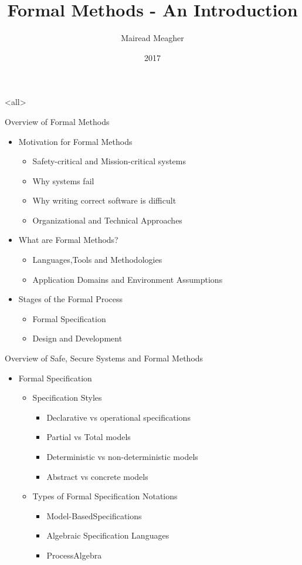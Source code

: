 \documentclass{beamerswitch}
\author[MM]{Mairead Meagher}
\title{Formal Methods - An Introduction}
\institute{Waterford Institute of Technology, }
\date{2017}
\begin{document}
 \mode<all>
\frame{\titlepage}
\begin{frame}{Overview of Formal Methods}
\begin{itemize}
  \item Motivation for Formal Methods
  	\begin{itemize}
		\item Safety-critical and Mission-critical systems
		\item Why systems fail
		\item Why writing correct software is difficult 
		\item Organizational and Technical Approaches
	\end{itemize}
  \item What are Formal Methods? 
	\begin{itemize}
	\item Languages,Tools and Methodologies
	\item Application Domains and Environment Assumptions
	\end{itemize}
  \item Stages of the Formal Process
  \begin{itemize}
  	\item Formal Specification
	\item Design and Development
   \end{itemize}
  \end{itemize}
  \end{frame}
  \begin{frame} {Overview of Safe, Secure Systems and Formal Methods}
  \begin{itemize}
   \item Formal Specification 
	\begin{itemize}
   		\item Specification Styles
		  \begin{itemize}
		    	\item Declarative vs operational specifications 
			\item Partial vs Total models 
			\item Deterministic vs non-deterministic models 
			\item Abstract vs concrete models
		\end{itemize}
		\item Types of Formal Specification Notations 
		\begin{itemize}
			\item Model-BasedSpecifications 
			\item Algebraic Specification Languages 
			\item ProcessAlgebra 
		\end{itemize}
	\end{itemize}	

\end{itemize}
\end{frame}
 
\end{document}
